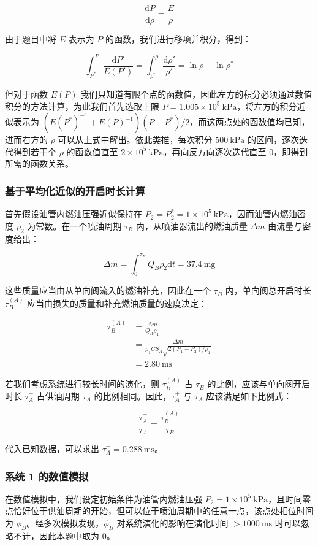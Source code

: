 \documentclass[withoutpreface,bwprint]{cumcmthesis}
\newcommand{\prb}{\times 10^5~\mathrm{kPa}}
\newcommand{\pre}{~\mathrm{kPa}}
\newcommand{\tim}{~\mathrm{ms}}
\newcommand{\mas}{~\mathrm{mg}}
\begin{document}
$$
\frac{\mathrm dP}{\mathrm d\rho}=\frac{E}{\rho}
$$

由于题目中将 $E$ 表示为 $P$ 的函数，我们进行移项并积分，得到：

$$
\int_{P^*}^{P}\frac{\mathrm dP'}{E(P')}=\int_{\rho^*}^{\rho}\frac{\mathrm d\rho'}{\rho'}=\ln\rho-\ln\rho^*
$$

但对于函数 $E(P)$ 我们只知道有限个点的函数值，因此左方的积分必须通过数值积分的方法计算，为此我们首先选取上限 $P = 1.005\prb$，将左方的积分近似表示为 $(E(P^*)^{-1}+E(P)^{-1})(P-P^*)/2$，而这两点处的函数值均已知，进而右方的 $\rho$ 可以从上式中解出。依此类推，每次积分 $500\pre$ 的区间，逐次迭代得到若干个 $\rho$ 的函数值直至 $2\prb$，再向反方向逐次迭代直至 $0$，即得到所需的函数关系。

\subsubsection{基于平均化近似的开启时长计算}

首先假设油管内燃油压强近似保持在 $P_2=P_2^*=1\prb$，因而油管内燃油密度 $\rho_2$ 为常数。在一个喷油周期 $\tau_B$ 内，从喷油器流出的燃油质量 $\Delta m$ 由流量与密度给出：

$$
\Delta m=\int_0^{\tau_B}Q_B\rho_2\mathrm dt=37.4\mas
$$

这些质量应当由从单向阀流入的燃油补充，因此在一个 $\tau_B$ 内，单向阀总开启时长 $\tau_B^{(A)}$ 应当由损失的质量和补充燃油质量的速度决定：

$$
\begin{aligned}
\tau_B^{(A)}&=\frac{\Delta m}{Q_A\rho_1}\\
&=\frac{\Delta m}{\rho_1CS_A\sqrt{2(P_1-P_2)/\rho_1}}\\
&=2.80\tim
\end{aligned}
$$

若我们考虑系统进行较长时间的演化，则 $\tau_B^{(A)}$ 占 $\tau_B$ 的比例，应该与单向阀开启时长 $\tau_A^+$ 占供油周期 $\tau_A$ 的比例相同。因此，$\tau_A^+$ 与 $\tau_A$ 应该满足如下比例式：

$$
\frac{\tau_A^+}{\tau_A}=\frac{\tau_B^{(A)}}{\tau_B}
$$

代入已知数据，可以求出 $\tau_A^+=0.288\tim$。

\subsubsection{系统 1 的数值模拟}

在数值模拟中，我们设定初始条件为油管内燃油压强 $P_2=1\prb$，且时间零点恰好位于供油周期的开始，但可以位于喷油周期中的任意一点，该点处相位时间为 $\phi_B$。经多次模拟发现，$\phi_B$ 对系统演化的影响在演化时间 $>1000\tim$ 时可以忽略不计，因此本题中取为 $0$。
\end{document}
